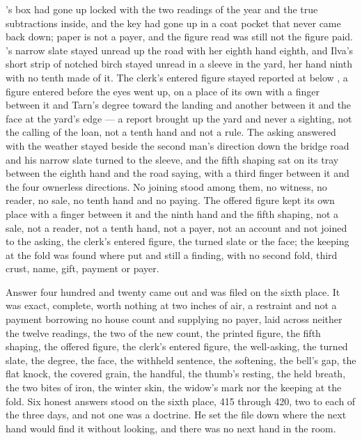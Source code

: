 's box had gone up  locked with the two readings of the year and the true subtractions inside, and the key had gone up in a coat pocket that never came back down; paper is not a payer, and the figure read was still not the figure paid. 's narrow slate stayed unread up the road with her eighth hand eighth, and Ilva's short strip of notched birch stayed unread in a sleeve in the yard, her hand ninth with no tenth made of it. The clerk's entered figure stayed reported at  below , a figure entered before the eyes went up, on a place of its own with a finger between it and Tarn's degree toward the landing and another between it and the face at the yard's edge --- a report brought up the yard and never a sighting, not the calling of the loan, not a tenth hand and not a rule. The asking answered with the weather stayed beside the second man's direction down the bridge road and his narrow slate turned to the sleeve, and the fifth shaping sat on its tray between the eighth hand and the road saying, with a third finger between it and the four ownerless directions. No joining stood among them, no witness, no reader, no sale, no tenth hand and no paying. The offered figure kept its own place with a finger between it and the ninth hand and the fifth shaping, not a sale, not a reader, not a tenth hand, not a payer, not an account and not joined to the asking, the clerk's entered figure, the turned slate or the face; the keeping at the fold was found where put and still a finding, with no second fold, third crust, name, gift, payment or payer.

Answer four hundred and twenty came out and was filed on the sixth place. It was exact, complete, worth nothing at two inches of air, a restraint and not a payment borrowing no house count and supplying no payer, laid across neither the twelve readings, the two of the new count, the printed figure, the fifth shaping, the offered figure, the clerk's entered figure, the well-asking, the turned slate, the degree, the face, the withheld sentence, the softening, the bell's gap, the flat knock, the covered grain, the handful, the thumb's resting, the held breath, the two bites of iron, the winter skin, the widow's mark nor the keeping at the fold. Six honest answers stood on the sixth place, 415 through 420, two to each of the three days, and not one was a doctrine. He set the file down where the next hand would find it without looking, and there was no next hand in the room.

